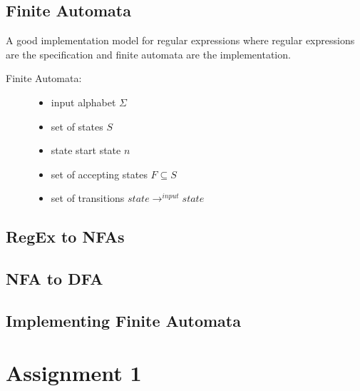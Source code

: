 \documentclass[a4paper, 10pt]{article}
\begin{document}
\subsection{Finite Automata}
A good implementation model for regular expressions where regular expressions are the specification and finite automata are the implementation.
\begin{description}
	\item[Finite Automata:]
	      \begin{itemize}
		      \item input alphabet $\Sigma$
		      \item set of states $S$
		      \item state start state $n$
		      \item set of accepting states $F \subseteq S$
		      \item set of transitions $state \rightarrow^{input} state$
	      \end{itemize}
\end{description}
\subsection{RegEx to NFAs}
\subsection{NFA to DFA}
\subsection{Implementing Finite Automata}
\section{Assignment 1}
\end{document}
